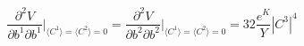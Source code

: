 \begin{equation}
\frac{\partial^2 V}{\partial b^1 \partial b^1} \Big|_{ \langle C^1
\rangle =  \langle C^2 \rangle  =0}= \frac{\partial^2 V}{\partial
b^2 \partial b^2} \Big|_{ \langle C^1 \rangle =  \langle C^2
\rangle  =0} = 32 \frac{e^K}{Y}|C^3|^4
\end{equation}

